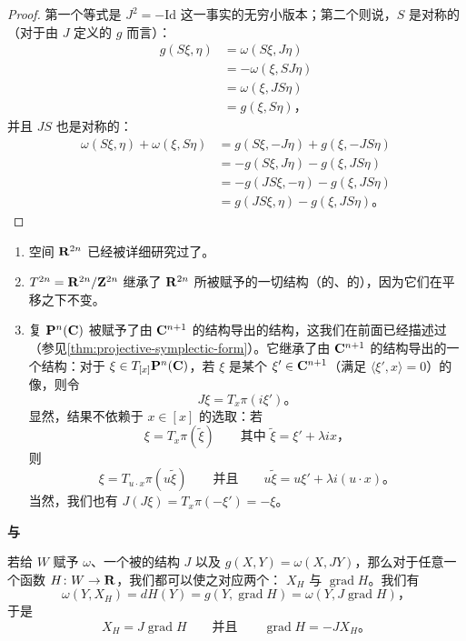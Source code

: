 \begin{proof}
第一个等式是 $J^2=-\mathrm{Id}$ 这一事实的无穷小版本；第二个则说，$S$ 是对称的（对于由 $J$ 定义的\trMetric{} $g$ 而言）：
\[
\begin{aligned}
g(S\xi,\eta)&=\omega(S\xi,J\eta)\\
&=-\omega(\xi,SJ\eta)\\
&=\omega(\xi,JS\eta)\\
&=g(\xi,S\eta)\text{，}
\end{aligned}
\]
并且 $JS$ 也是对称的：
\[
\begin{aligned}
\omega(S\xi,\eta)+\omega(\xi,S\eta)
&=g(S\xi,-J\eta)+g(\xi,-JS\eta)\\
&=-g(S\xi,J\eta)-g(\xi,JS\eta)\\
&=-g(JS\xi,-\eta)-g(\xi,JS\eta)\\
&=g(JS\xi,\eta)-g(\xi,JS\eta)\text{。}
\end{aligned}
\]
\end{proof}

\begin{example}\label{thm:examples-calibrated-manifolds}
\begin{enumerate}[label=(\arabic*)]
\item \trEuclidean{}空间 $\mathbf{R}^{2n}$ 已经被详细研究过了。
\item \trTorus{} $T^{2n}=\mathbf{R}^{2n}/\mathbf{Z}^{2n}$ 继承了 $\mathbf{R}^{2n}$ 所被赋予的一切结构（\trSymplectic{}的、\trAlmostComplex{}的），因为它们在平移之下不变。
\item 复\trProjectiveSpace{} $\mathbf{P}^n(\mathbf{C})$ 被赋予了由 $\mathbf{C}^{n+1}$ 的\trSymplectic{}结构导出的\trSymplectic{}结构，这我们在前面已经描述过（参见\cref{thm:projective-symplectic-form}）。它继承了由 $\mathbf{C}^{n+1}$ 的\trAlmostComplex{}结构导出的一个\trAlmostComplex{}结构：对于 $\xi\in T_{[x]}\mathbf{P}^n(\mathbf{C})$，若 $\xi$ 是某个 $\xi'\in\mathbf{C}^{n+1}$（满足 $\langle\xi',x\rangle=0$）的像，则令
\[
J\xi=T_x\pi(i\xi')\text{。}
\]
显然，结果不依赖于 $x\in[x]$ 的选取：若
\[
\xi=T_x\pi(\widetilde{\xi})\qquad\text{其中 }\widetilde{\xi}=\xi'+\lambda ix\text{，}
\]
则
\[
\xi=T_{u\cdot x}\pi(u\widetilde{\xi})\qquad\text{并且}\qquad u\widetilde{\xi}=u\xi'+\lambda i(u\cdot x)\text{。}
\]
当然，我们也有 $J(J\xi)=T_x\pi(-\xi')=-\xi$。
\end{enumerate}
\end{example}

\textbf{\trGradient{}与\trHamiltonian{}\trVectorField}

若给 $W$ 赋予\trSymplecticForm{} $\omega$、一个被\trCalibrated{}的\trAlmostComplex{}结构 $J$ 以及\trRiemann\trMetric{} $g(X,Y)=\omega(X,JY)$，那么对于任意一个函数 $H\colon W\to\mathbf{R}$，我们都可以使之对应两个\trVectorField：\trHamiltonian{}\trVectorField{} $X_H$ 与\trGradient{} $\operatorname{grad}H$。我们有
\[
\omega(Y,X_H)=dH(Y)=g(Y,\operatorname{grad}H)=\omega(Y,J\operatorname{grad}H)\text{，}
\]
于是
\[
X_H=J\operatorname{grad}H\qquad\text{并且}\qquad\operatorname{grad}H=-JX_H\text{。}
\]

